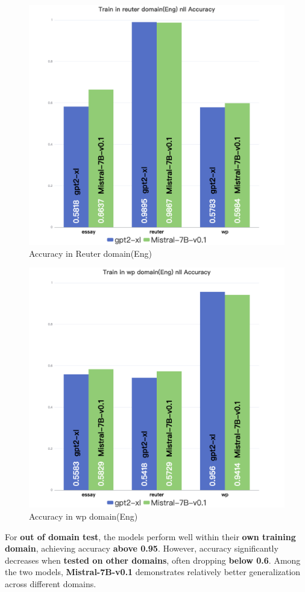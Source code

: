 \documentclass[lettersize,journal]{IEEEtran}
\begin{document}
    \begin{figure}[H]
        \centering
    \includegraphics[width=0.8\linewidth]{images/Train in reuter domain(Eng) nll Accuracy.png}
    \caption{Accuracy in Reuter domain(Eng)}
\end{figure}
 
    \begin{figure}[H]
        \centering
    \includegraphics[width=0.8\linewidth]{images/Train in wp domain(Eng) nll Accuracy.png}
    \caption{Accuracy in wp domain(Eng)}
\end{figure}

For \textbf{out of domain test}, the models perform well within their \textbf{own training domain}, achieving accuracy \textbf{above 0.95}. However, accuracy significantly decreases when \textbf{tested on other domains}, often dropping \textbf{below 0.6}. Among the two models, \textbf{Mistral-7B-v0.1} demonstrates relatively better generalization across different domains.
\end{document}
